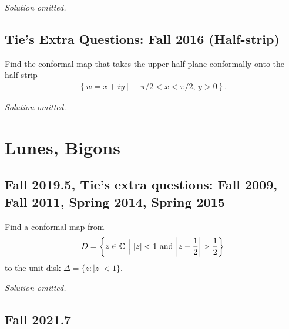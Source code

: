 \emph{Solution omitted.}

\hypertarget{ties-extra-questions-fall-2016-half-strip}{%
\subsection{Tie's Extra Questions: Fall 2016
(Half-strip)}\label{ties-extra-questions-fall-2016-half-strip}}

\begin{problem}[?]

Find the conformal map that takes the upper half-plane conformally onto
the half-strip
\begin{align*}
\left\{{w=x+iy {~\mathrel{\Big\vert}~}-\pi/2 < x < \pi/2,\, y>0}\right\}
.\end{align*}

\end{problem}

\emph{Solution omitted.}

\hypertarget{lunes-bigons}{%
\section{Lunes, Bigons}\label{lunes-bigons}}

\hypertarget{fall-2019.5-ties-extra-questions-fall-2009-fall-2011-spring-2014-spring-2015}{%
\subsection{Fall 2019.5, Tie's extra questions: Fall 2009, Fall 2011,
Spring 2014, Spring
2015}\label{fall-2019.5-ties-extra-questions-fall-2009-fall-2011-spring-2014-spring-2015}}

\begin{problem}[?]

Find a conformal map from
\begin{align*}
D=\left\{{ z\in {\mathbb{C}}{~\mathrel{\Big\vert}~}|z|<1 \text{ and } {\left\lvert { z-{1\over 2}} \right\rvert}>{1\over 2}}\right\}
\end{align*}
to the unit disk \(\Delta=\{z:|z|<1\}\).

\end{problem}

\emph{Solution omitted.}

\hypertarget{fall-2021.7}{%
\subsection{Fall 2021.7}\label{fall-2021.7}}

